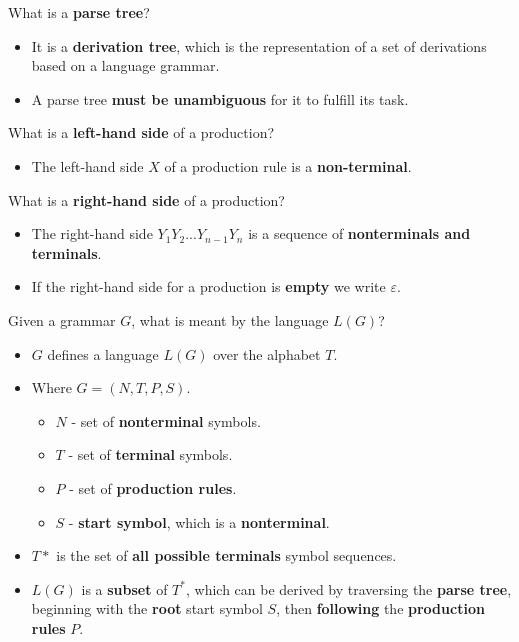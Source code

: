 \documentclass[11pt]{beamer}
\begin{document}
\begin{frame}
\begin{block}{What is a \textbf{parse tree}?}
\begin{itemize}
\item It is a \textbf{derivation tree}, which is the representation of a set of derivations based on a language grammar.
\item A parse tree \textbf{must be unambiguous} for it to fulfill its task.
\end{itemize}
\end{block}


\begin{block}{What is a \textbf{left-hand side} of a production?}
\begin{itemize}
\item The left-hand side $X$ of a production rule is a \textbf{non-terminal}.
\end{itemize}
\end{block}

\begin{block}{What is a \textbf{right-hand side} of a production?}
\begin{itemize}
\item The right-hand side $Y_1 Y_2 ... Y_{n-1} Y_{n}$  is a sequence of \textbf{nonterminals and terminals}.
\item If the right-hand side for a production is \textbf{empty} we write $\varepsilon$.
\end{itemize}
\end{block}

\end{frame}

\begin{frame}


\begin{block}{Given a grammar $G$, what is meant by the language $L(G)$?}
\begin{itemize}
\item $G$ defines a language $L(G)$ over the alphabet $T$.
\item Where $G=(N,T,P,S)$.
\begin{itemize}
\item $N$ - set of \textbf{nonterminal} symbols.
\item $T$ - set of \textbf{terminal} symbols.
\item $P$ - set of \textbf{production rules}.
\item $S$ - \textbf{start symbol}, which is a \textbf{nonterminal}.
\end{itemize}
\item $T*$ is the set of \textbf{all possible terminals} symbol sequences.
\item $L(G)$ is a \textbf{subset} of $T^*$, which can be derived by traversing the \textbf{parse tree}, beginning with the \textbf{root} start symbol $S$, then \textbf{following} the \textbf{production rules} $P$.
\end{itemize}
\end{block}


\end{frame}
\end{document}
